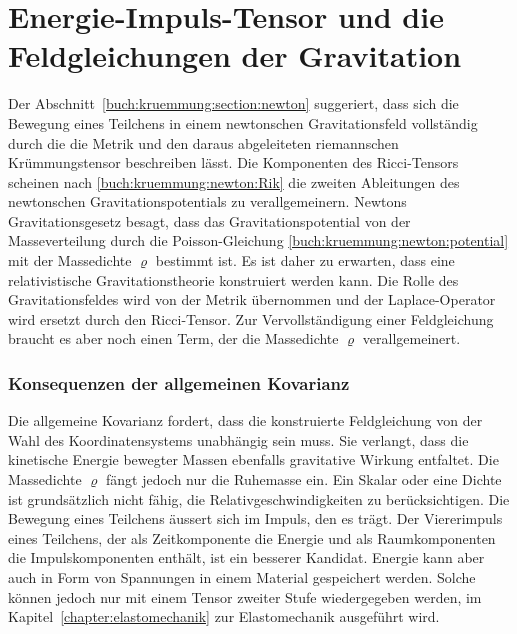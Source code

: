 %
%
\section{Energie-Impuls-Tensor und die Feldgleichungen der Gravitation
\label{buch:kruemmung:section:gravitation}}

Der Abschnitt~\ref{buch:kruemmung:section:newton} suggeriert, dass sich
die Bewegung eines Teilchens in einem newtonschen Gravitationsfeld
vollständig durch die die Metrik und den daraus abgeleiteten riemannschen
Krümmungstensor beschreiben lässt.
Die Komponenten des Ricci-Tensors scheinen nach
\eqref{buch:kruemmung:newton:Rik} die zweiten Ableitungen des
newtonschen Gravitationspotentials zu verallgemeinern.
Newtons Gravitationsgesetz besagt, dass das Gravitationspotential von
der Masseverteilung durch die Poisson-Gleichung
\eqref{buch:kruemmung:newton:potential}
mit der Massedichte $\varrho$ bestimmt ist.
Es ist daher zu erwarten, dass eine relativistische Gravitationstheorie
konstruiert werden kann.
Die Rolle des Gravitationsfeldes wird von der Metrik übernommen und der
Laplace-Operator wird ersetzt durch den Ricci-Tensor.
Zur Vervollständigung einer Feldgleichung braucht es aber noch einen
Term, der die Massedichte $\varrho$ verallgemeinert.

%
%
\subsubsection{Konsequenzen der allgemeinen Kovarianz}
Die allgemeine Kovarianz fordert, dass die konstruierte Feldgleichung
von der Wahl des Koordinatensystems unabhängig sein muss.
Sie verlangt, dass die kinetische Energie bewegter Massen ebenfalls
gravitative Wirkung entfaltet.
Die Massedichte $\varrho$ fängt jedoch nur die Ruhemasse ein.
Ein Skalar oder eine Dichte ist grundsätzlich nicht fähig, die
Relativgeschwindigkeiten zu berücksichtigen.
Die Bewegung eines Teilchens äussert sich im Impuls, den es trägt.
Der Viererimpuls eines Teilchens, der als Zeitkomponente die Energie
und als Raumkomponenten die Impulskomponenten enthält, ist ein
besserer Kandidat.
Energie kann aber auch in Form von Spannungen in einem Material 
gespeichert werden.
Solche können jedoch nur mit einem Tensor zweiter Stufe wiedergegeben
werden, im Kapitel~\ref{chapter:elastomechanik} zur Elastomechanik
ausgeführt wird.

